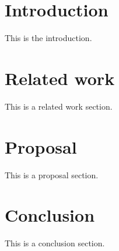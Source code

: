 \documentclass[11pt,a4paper]{article}
\begin{document}
\Capa

\FolhaRosto


\section{Introduction}
This is the introduction.

\section{Related work}
This is a related work section.

\section{Proposal}
This is a proposal section.

\section{Conclusion}
This is a conclusion section.
 

%
\end{document}

